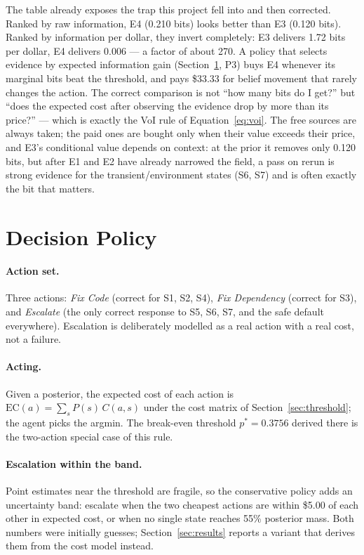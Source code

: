 \documentclass{article}
\begin{document}
The table already exposes the trap this project fell into and then corrected. Ranked by raw information, E4 (0.210 bits) looks better than E3 (0.120 bits). Ranked by information per dollar, they invert completely: E3 delivers 1.72 bits per dollar, E4 delivers 0.006 --- a factor of about 270. A policy that selects evidence by expected information gain (Section~\ref{sec:policy}, P3) buys E4 whenever its marginal bits beat the threshold, and pays \$33.33 for belief movement that rarely changes the action. The correct comparison is not ``how many bits do I get?'' but ``does the expected cost after observing the evidence drop by more than its price?'' --- which is exactly the VoI rule of Equation~\ref{eq:voi}. The free sources are always taken; the paid ones are bought only when their value exceeds their price, and E3's conditional value depends on context: at the prior it removes only 0.120 bits, but after E1 and E2 have already narrowed the field, a pass on rerun is strong evidence for the transient/environment states (S6, S7) and is often exactly the bit that matters.

\section{Decision Policy}
\label{sec:policy}

\paragraph{Action set.} Three actions: \emph{Fix Code} (correct for S1, S2, S4), \emph{Fix Dependency} (correct for S3), and \emph{Escalate} (the only correct response to S5, S6, S7, and the safe default everywhere). Escalation is deliberately modelled as a real action with a real cost, not a failure.

\paragraph{Acting.} Given a posterior, the expected cost of each action is $\mathrm{EC}(a) = \sum_s P(s)\,C(a,s)$ under the cost matrix of Section~\ref{sec:threshold}; the agent picks the argmin. The break-even threshold $p^* = 0.3756$ derived there is the two-action special case of this rule.

\paragraph{Escalation within the band.} Point estimates near the threshold are fragile, so the conservative policy adds an uncertainty band: escalate when the two cheapest actions are within \$5.00 of each other in expected cost, or when no single state reaches 55\% posterior mass. Both numbers were initially guesses; Section~\ref{sec:results} reports a variant that derives them from the cost model instead.
\end{document}
